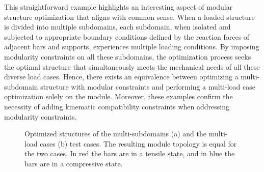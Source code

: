 This straightforward example highlights an interesting aspect of modular structure optimization that aligns with common sense. When a loaded structure is divided into multiple subdomains, each subdomain, when isolated and subjected to appropriate boundary conditions defined by the reaction forces of adjacent bars and supports, experiences multiple loading conditions. By imposing modularity constraints on all these subdomains, the optimization process seeks the optimal structure that simultaneously meets the mechanical needs of all these diverse load cases. Hence, there exists an equivalence between optimizing a multi-subdomain structure with modular constraints and performing a multi-load case optimization solely on the module. Moreover, these examples confirm the necessity of adding kinematic compatibility constraints when addressing modularity constraints.
\begin{figure}[]
    \hspace*{\fill}
    \hfill
    \hspace*{\fill}
    \caption{Optimized structures of the multi-subdomains (a) and the multi-load cases (b) test cases. The resulting module topology is equal for the two cases. In red the bars are in a tensile state, and in blue the bars are in a compressive state.}
    \label{fig:05_cell_multi_eq}
\end{figure}

